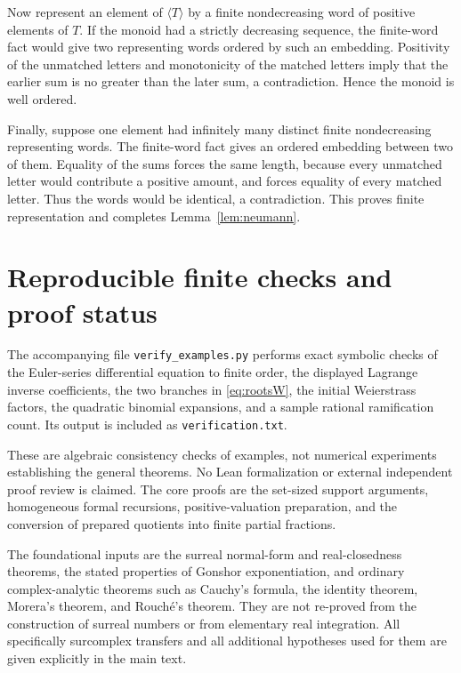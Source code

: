 \documentclass[11pt,a4paper]{article}
\numberwithin{equation}{section}
\theoremstyle{definition}
\theoremstyle{remark}
\begin{document}
Now represent an element of $\langle T\rangle$ by a finite nondecreasing word of positive elements of $T$. If the monoid had a strictly decreasing sequence, the finite-word fact would give two representing words ordered by such an embedding. Positivity of the unmatched letters and monotonicity of the matched letters imply that the earlier sum is no greater than the later sum, a contradiction. Hence the monoid is well ordered.

Finally, suppose one element had infinitely many distinct finite nondecreasing representing words. The finite-word fact gives an ordered embedding between two of them. Equality of the sums forces the same length, because every unmatched letter would contribute a positive amount, and forces equality of every matched letter. Thus the words would be identical, a contradiction. This proves finite representation and completes Lemma~\ref{lem:neumann}.

\section{Reproducible finite checks and proof status}
\label{app:checks}
The accompanying file \texttt{verify\_examples.py} performs exact symbolic checks of the Euler-series differential equation to finite order, the displayed Lagrange inverse coefficients, the two branches in \eqref{eq:rootsW}, the initial Weierstrass factors, the quadratic binomial expansions, and a sample rational ramification count. Its output is included as \texttt{verification.txt}.

These are algebraic consistency checks of examples, not numerical experiments establishing the general theorems. No Lean formalization or external independent proof review is claimed. The core proofs are the set-sized support arguments, homogeneous formal recursions, positive-valuation preparation, and the conversion of prepared quotients into finite partial fractions.

The foundational inputs are the surreal normal-form and real-closedness theorems, the stated properties of Gonshor exponentiation, and ordinary complex-analytic theorems such as Cauchy's formula, the identity theorem, Morera's theorem, and Rouch\'e's theorem. They are not re-proved from the construction of surreal numbers or from elementary real integration. All specifically surcomplex transfers and all additional hypotheses used for them are given explicitly in the main text.
\end{document}

